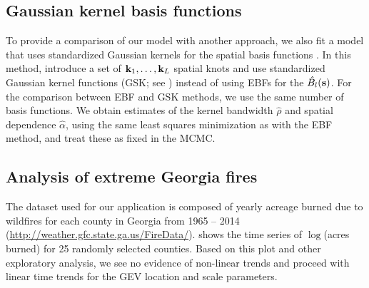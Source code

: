 \documentclass[11pt]{article}
\begin{document}
\subsection{Gaussian kernel basis functions}
To provide a comparison of our model with another approach, we also fit a model that uses standardized Gaussian kernels for the spatial basis functions \citep{Reich2012}.
In this method, \citeauthor{Reich2012} introduce a set of $\mbox{\bf k}_1, \ldots, \mbox{\bf k}_L$ spatial knots and use standardized Gaussian kernel functions (GSK; see ) instead of using EBFs for the $\hat{B_l}(\mbox{\bf s})$.
For the comparison between EBF and GSK methods, we use the same number of basis functions.
We obtain estimates of the kernel bandwidth $\hat{\rho}$ and spatial dependence $\hat{\alpha}$, using the same least squares minimization as with the EBF method, and treat these as fixed in the MCMC.

\subsection{Analysis of extreme Georgia fires}\label{ebs:georgia}
The dataset used for our application is composed of yearly acreage burned due to wildfires for each county in Georgia from 1965 -- 2014 (\url{http://weather.gfc.state.ga.us/FireData/}).
 shows the time series of $\log$(acres burned) for 25 randomly selected counties.
Based on this plot and other exploratory analysis, we see no evidence of non-linear trends and proceed with linear time trends for the GEV location and scale parameters.
\end{document}
